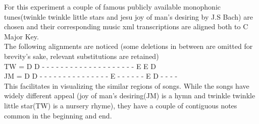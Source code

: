 \noindent For this experiment a couple of famous publicly available monophonic tunes(twinkle twinkle little stars and jesu joy of man's desiring by J.S Bach) are chosen and their corresponding music xml transcriptions are aligned both to C Major Key. \\

\noindent The following alignments are noticed (some deletions in between are omitted for brevity's sake, relevant substitutions are retained) \\

\noindent TW = D D - - - - - - - - - - - - - - - - - - - - E E D \\
\noindent JM = D D - - - - - - - - - - - - - - - E - - - - - - E D - - - - \\ 

\noindent This facilitates in visualizing the similar regions of songs. While the songs have widely different appeal (joy of man's desiring(JM) is a hymn and twinkle twinkle little star(TW) is a nursery rhyme), they have a couple of contiguous notes common in the beginning and end.  


 


